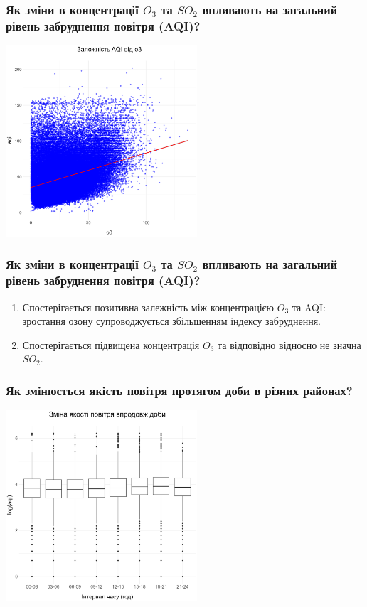 \documentclass{beamer}
\begin{document}
\begin{frame}
  \frametitle{Як зміни в концентрації $O_3$ та $SO_2$ впливають на загальний рівень забруднення повітря (AQI)?}

  \begin{center}
    \includegraphics[height=2.8in]{plots/question2/scatter_plot.png}
  \end{center}
\end{frame}

\begin{frame}
  \frametitle{Як зміни в концентрації $O_3$ та $SO_2$ впливають на загальний рівень забруднення повітря (AQI)?}

  \begin{enumerate}
    \item Спостерігається позитивна залежність між концентрацією $O_3$ та AQI: зростання озону супроводжується збільшенням індексу забруднення.
    \item Спостерігається підвищена концентрація $O_3$ та відповідно відносно не значна $SO_2$.
  \end{enumerate}
\end{frame}


\begin{frame}
  \frametitle{Як змінюється якість повітря протягом доби в різних районах?}

  \begin{center}
    \includegraphics[height=2.8in]{plots/question3/box.png}
  \end{center}
\end{frame}
\end{document}

